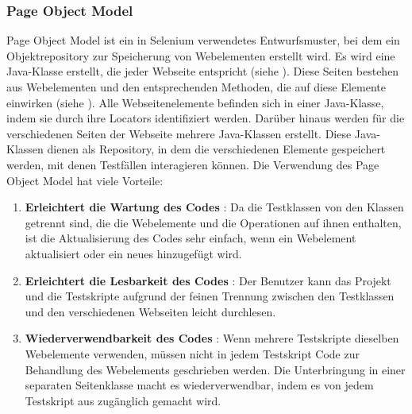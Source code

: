 \subsubsection{Page Object Model}

Page Object Model ist ein in Selenium verwendetes Entwurfsmuster,
bei dem ein Objektrepository zur Speicherung von Webelementen
erstellt wird. Es wird eine Java-Klasse erstellt, die jeder Webseite
entspricht (siehe ). Diese Seiten bestehen aus Webelementen und den
entsprechenden Methoden, die auf diese Elemente einwirken (siehe ).
Alle Webseitenelemente befinden sich in einer Java-Klasse, indem sie durch
ihre Locators identifiziert werden.  Darüber hinaus werden für die
verschiedenen Seiten der Webseite mehrere Java-Klassen erstellt. Diese
Java-Klassen dienen als Repository, in dem die verschiedenen Elemente
gespeichert werden, mit denen Testfällen interagieren können. Die Verwendung
des Page Object Model hat viele Vorteile:

\begin{enumerate}
    \item \textbf{Erleichtert die Wartung des Codes} : Da die Testklassen von den
    Klassen getrennt sind, die die Webelemente und die Operationen auf
    ihnen enthalten, ist die Aktualisierung des Codes sehr einfach, wenn
    ein Webelement aktualisiert oder ein neues hinzugefügt wird.
    \item \textbf{Erleichtert die Lesbarkeit des Codes} : Der Benutzer kann das Projekt
    und die Testskripte aufgrund der feinen Trennung zwischen den Testklassen
    und den verschiedenen Webseiten leicht durchlesen.
    \item \textbf{Wiederverwendbarkeit des Codes} : Wenn mehrere Testskripte dieselben
    Webelemente verwenden, müssen nicht in jedem Testskript Code zur
    Behandlung des Webelements geschrieben werden. Die Unterbringung in einer
    separaten Seitenklasse macht es wiederverwendbar, indem es von jedem
    Testskript aus zugänglich gemacht wird.
\end{enumerate}

